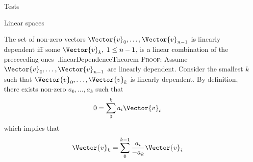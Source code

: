 \documentclass{PalisadesLakesBook}
\begin{document}
\begin{plSection}{Tests}
\begin{plSection}{Linear spaces}
\begin{plTheorem}{The set of non-zero vectors
 $\Vector{v}_0, \ldots ,\Vector{v}_{n-1}$
is linearly dependent iff some $\Vector{v}_k, \; 1 \leq n-1$, 
is a linear combination of the precceeding 
ones~\cite[Section 6]{Halmos:1958:Finite}.}{linearDependenceTheorem}
\textsc{Proof:}
Assume  $\Vector{v}_0, \ldots ,\Vector{v}_{n-1}$ are linearly dependent.
Consider the smallest $k$ such that 
$\Vector{v}_0, \ldots ,\Vector{v}_{k}$ is linearly dependent.
By definition,
there exists non-zero $a_0, \ldots ,a_{k}$ such that
\begin{equation}
0 = \sum_0^k a_i \Vector{v}_i
\end{equation}
which implies that
\begin{equation}
\Vector{v}_k = \sum_0^{k-1} \frac{a_i}{- a_k} \Vector{v}_i
\end{equation}
\end{plTheorem}


\end{plSection}
\end{plSection}
\end{document}
